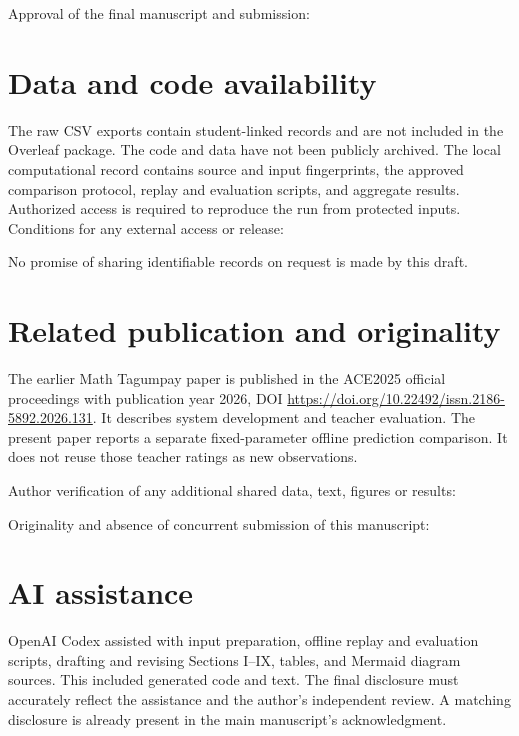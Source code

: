 \documentclass[11pt]{article}
\begin{document}
Approval of the final manuscript and submission: \AAIEAuthorApproval
\section*{Data and code availability}
The raw CSV exports contain student-linked records and are not included in the
Overleaf package. The code and data have not been publicly archived. The local
computational record contains source and input fingerprints, the approved
comparison protocol, replay and evaluation scripts, and aggregate results.
Authorized access is required to reproduce the run from protected inputs.
Conditions for any external access or release: \AAIEDataAccessConditions

No promise of sharing identifiable records on request is made by this draft.
\section*{Related publication and originality}
The earlier Math Tagumpay paper is published in the ACE2025 official proceedings
with publication year 2026, DOI \url{https://doi.org/10.22492/issn.2186-5892.2026.131}.
It describes system development and teacher evaluation. The present paper reports
a separate fixed-parameter offline prediction comparison. It does not reuse those
teacher ratings as new observations.

Author verification of any additional shared data, text, figures or results:
\AAIEOverlapConfirmation

Originality and absence of concurrent submission of this manuscript:
\AAIEOriginalityConfirmation
\section*{AI assistance}
OpenAI Codex assisted with input preparation, offline replay and evaluation scripts,
drafting and revising Sections I--IX, tables, and Mermaid diagram sources. This
included generated code and text. The final disclosure must accurately reflect the
assistance and the author's independent review. A matching disclosure is already
present in the main manuscript's acknowledgment.
\end{document}
